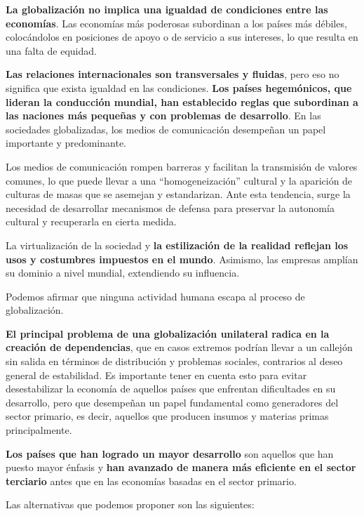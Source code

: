 \documentclass[
  letterpaper,
  DIV=11,
  numbers=noendperiod]{scrartcl}
\begin{document}
\textbf{La globalización no implica una igualdad de condiciones entre
las economías}. Las economías más poderosas subordinan a los países más
débiles, colocándolos en posiciones de apoyo o de servicio a sus
intereses, lo que resulta en una falta de equidad.

\textbf{Las relaciones internacionales son transversales y fluidas},
pero eso no significa que exista igualdad en las condiciones.
\textbf{Los países hegemónicos, que lideran la conducción mundial, han
establecido reglas que subordinan a las naciones más pequeñas y con
problemas de desarrollo}. En las sociedades globalizadas, los medios de
comunicación desempeñan un papel importante y predominante.

Los medios de comunicación rompen barreras y facilitan la transmisión de
valores comunes, lo que puede llevar a una ``homogeneización'' cultural
y la aparición de culturas de masas que se asemejan y estandarizan. Ante
esta tendencia, surge la necesidad de desarrollar mecanismos de defensa
para preservar la autonomía cultural y recuperarla en cierta medida.

La virtualización de la sociedad y \textbf{la estilización de la
realidad reflejan los usos y costumbres impuestos en el mundo}.
Asimismo, las empresas amplían su dominio a nivel mundial, extendiendo
su influencia.

Podemos afirmar que ninguna actividad humana escapa al proceso de
globalización.

\textbf{El principal problema de una globalización unilateral radica en
la creación de dependencias}, que en casos extremos podrían llevar a un
callejón sin salida en términos de distribución y problemas sociales,
contrarios al deseo general de estabilidad. Es importante tener en
cuenta esto para evitar desestabilizar la economía de aquellos países
que enfrentan dificultades en su desarrollo, pero que desempeñan un
papel fundamental como generadores del sector primario, es decir,
aquellos que producen insumos y materias primas principalmente.

\textbf{Los países que han logrado un mayor desarrollo} son aquellos que
han puesto mayor énfasis y \textbf{han avanzado de manera más eficiente
en el sector terciario} antes que en las economías basadas en el sector
primario.

Las alternativas que podemos proponer son las siguientes:
\end{document}

